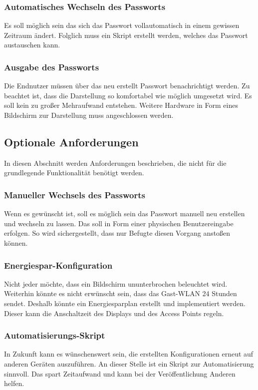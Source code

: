\documentclass[a4paper,11pt,singlespacing]{article}
\begin{document}
    			\subsubsection{Automatisches Wechseln des Passworts}
    			    Es soll möglich sein das sich das Passwort vollautomatisch in einem gewissen Zeitraum ändert. Folglich muss ein Skript erstellt werden, welches das Passwort austauschen kann.
    			\subsubsection{Ausgabe des Passworts}
		            Die Endnutzer müssen über das neu erstellt Passwort benachrichtigt werden. Zu beachtet ist, dass die Darstellung so komfortabel wie möglich umgesetzt wird. Es soll kein zu großer Mehraufwand entstehen. Weitere Hardware in Form eines Bildschirm zur Darstellung muss angeschlossen werden.
		            
			\subsection{Optionale Anforderungen}
			    In diesen Abschnitt werden Anforderungen beschrieben, die nicht für die grundlegende Funktionalität benötigt werden.
                \subsubsection{Manueller Wechsels des Passworts}
                    Wenn es gewünscht ist, soll es möglich sein das Passwort manuell neu erstellen und wechseln zu lassen. Das soll in Form einer physischen Benutzereingabe erfolgen. So wird sichergestellt, dass nur Befugte diesen Vorgang anstoßen können. 
                \subsubsection{Energiespar-Konfiguration}
                    Nicht jeder möchte, dass ein Bildschirm ununterbrochen beleuchtet wird. Weiterhin könnte es nicht erwünscht sein, dass das Gast-WLAN 24 Stunden sendet. Deshalb könnte ein Energiesparplan erstellt und implementiert werden. Dieser kann die Anschaltzeit des Displays und des Access Points regeln. 
                \subsubsection{Automatisierungs-Skript}
                    In Zukunft kann es wünschenswert sein, die erstellten Konfigurationen erneut auf anderen Geräten auszuführen. An dieser Stelle ist ein Skript zur Automatisierung sinnvoll. Das spart Zeitaufwand und kann bei der Veröffentlichung Anderen helfen.  
\end{document}
